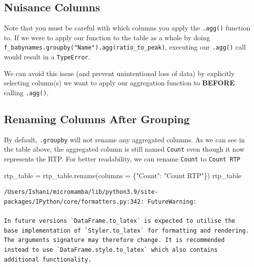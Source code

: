 \documentclass[
  letterpaper,
  DIV=11,
  numbers=noendperiod]{scrreprt}
\newenvironment{Shaded}{\begin{snugshade}}{\end{snugshade}}
\newcommand{\NormalTok}[1]{\textcolor[rgb]{0.00,0.23,0.31}{#1}}
\newcommand{\OperatorTok}[1]{\textcolor[rgb]{0.37,0.37,0.37}{#1}}
\newcommand{\StringTok}[1]{\textcolor[rgb]{0.13,0.47,0.30}{#1}}
\begin{document}
\hypertarget{nuisance-columns}{%
\subsection{Nuisance Columns}\label{nuisance-columns}}

Note that you must be careful with which columns you apply the
\texttt{.agg()} function to. If we were to apply our function to the
table as a whole by doing
\texttt{f\_babynames.groupby("Name").agg(ratio\_to\_peak)}, executing
our \texttt{.agg()} call would result in a \texttt{TypeError}.

We can avoid this issue (and prevent unintentional loss of data) by
explicitly selecting column(s) we want to apply our aggregation function
to \textbf{BEFORE} calling \texttt{.agg()},

\hypertarget{renaming-columns-after-grouping}{%
\subsection{Renaming Columns After
Grouping}\label{renaming-columns-after-grouping}}

By default, \texttt{.groupby} will not rename any aggregated columns. As
we can see in the table above, the aggregated column is still named
\texttt{Count} even though it now represents the RTP. For better
readability, we can rename \texttt{Count} to \texttt{Count\ RTP}

\begin{Shaded}
\begin{Highlighting}[]
\NormalTok{rtp\_table }\OperatorTok{=}\NormalTok{ rtp\_table.rename(columns }\OperatorTok{=}\NormalTok{ \{}\StringTok{"Count"}\NormalTok{: }\StringTok{"Count RTP"}\NormalTok{\})}
\NormalTok{rtp\_table}
\end{Highlighting}
\end{Shaded}

\begin{verbatim}
/Users/Ishani/micromamba/lib/python3.9/site-packages/IPython/core/formatters.py:342: FutureWarning:

In future versions `DataFrame.to_latex` is expected to utilise the base implementation of `Styler.to_latex` for formatting and rendering. The arguments signature may therefore change. It is recommended instead to use `DataFrame.style.to_latex` which also contains additional functionality.
\end{verbatim}
\end{document}
